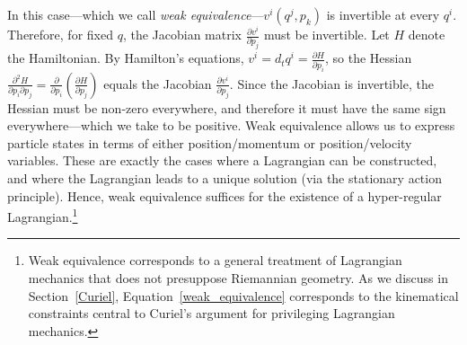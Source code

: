 \documentclass[12pt, english, twoside]{article} %
\begin{document}
In this case---which we call \textit{weak equivalence}---$v^i(q^j, p_k)$ is invertible at every $q^i$. Therefore, for fixed $q$, the Jacobian matrix  $\frac{\partial v^i}{\partial p_j}$ must be invertible. Let $H$ denote the Hamiltonian. By Hamilton's equations, $v^i = d_t q^i = \frac{\partial H}{\partial p_i}$, so the Hessian $\frac{\partial^2 H}{\partial p_i \partial p_j} = \frac{\partial}{\partial p_i} (\frac{\partial H}{\partial p_j})$ equals the Jacobian $\frac{\partial v^i}{\partial p_j}$. Since the Jacobian is invertible, the Hessian must be non-zero everywhere, and therefore it must have the same sign everywhere---which we take to be positive. Weak equivalence allows us to express particle states in terms of either position/momentum or position/velocity variables. These are exactly the cases where a Lagrangian can be constructed, and where the Lagrangian leads to a unique solution (via the stationary action principle). Hence, weak equivalence suffices for the existence of a hyper-regular Lagrangian.\footnote{Weak equivalence corresponds to a general treatment of Lagrangian mechanics that does not presuppose Riemannian geometry. As we discuss in Section~\ref{Curiel}, Equation~\ref{weak_equivalence} corresponds to the kinematical constraints central to Curiel's \parencites*[]{Curiel} argument for privileging Lagrangian mechanics.}
\end{document}
